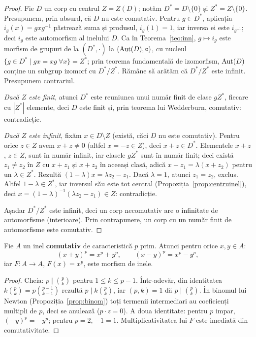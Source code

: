 \begin{proof}
Fie $D$ un corp cu centrul $Z=Z(D)$; notăm $D^*=D\setminus\{0\}$ și $Z^*=Z\setminus\{0\}$. Presupunem, prin absurd, că $D$ nu este comutativ. Pentru $g\in D^*$, aplicația $i_g(x)=gxg^{-1}$ păstrează suma și produsul, $i_g(1)=1$, iar inversa ei este $i_{g^{-1}}$; deci $i_g$ este automorfism al inelului $D$. Ca în Teorema~\ref{teo:inn}, $g\mapsto i_g$ este morfism de grupuri de la $(D^*,\cdot)$ la $(\operatorname{Aut}(D),\circ)$, cu nucleul $\{g\in D^*\mid gx=xg\ \forall x\}=Z^*$; prin teorema fundamentală de izomorfism, $\operatorname{Aut}(D)$ conține un subgrup izomorf cu $D^*/Z^*$. Rămâne să arătăm că $D^*/Z^*$ este infinit. Presupunem contrariul.

\emph{Dacă $Z$ este finit}, atunci $D^*$ este reuniunea unui număr finit de clase $gZ^*$, fiecare cu $|Z^*|$ elemente, deci $D$ este finit și, prin teorema lui Wedderburn, comutativ: contradicție.

\emph{Dacă $Z$ este infinit}, fixăm $x\in D\setminus Z$ (există, căci $D$ nu este comutativ). Pentru orice $z\in Z$ avem $x+z\neq0$ (altfel $x=-z\in Z$), deci $x+z\in D^*$. Elementele $x+z$, $z\in Z$, sunt în număr infinit, iar clasele $gZ^*$ sunt în număr finit; deci există $z_1\neq z_2$ în $Z$ cu $x+z_1$ și $x+z_2$ în aceeași clasă, adică $x+z_1=\lambda(x+z_2)$ pentru un $\lambda\in Z^*$. Rezultă $(1-\lambda)x=\lambda z_2-z_1$. Dacă $\lambda=1$, atunci $z_1=z_2$, exclus. Altfel $1-\lambda\in Z^*$, iar inversul său este tot central (Propoziția~\ref{prop:centruinel}), deci $x=(1-\lambda)^{-1}(\lambda z_2-z_1)\in Z$: contradicție.

Așadar $D^*/Z^*$ este infinit, deci un corp necomutativ are o infinitate de automorfisme (interioare). Prin contrapunere, un corp cu un număr finit de automorfisme este comutativ.
\end{proof}

\begin{teorema}\label{teo:frobenius}
Fie $A$ un inel \textbf{comutativ} de caracteristică $p$ prim. Atunci pentru orice $x,y\in A$:
\[
(x+y)^p=x^p+y^p,\qquad (x-y)^p=x^p-y^p,
\]
iar $F:A\to A$, $F(x)=x^p$, este morfism de inele.
\end{teorema}

\begin{proof}
Cheia: $p\mid\binom pk$ pentru $1\le k\le p-1$. Într-adevăr, din identitatea $k\binom pk=p\binom{p-1}{k-1}$ rezultă $p\mid k\binom pk$, iar $(p,k)=1$ dă $p\mid\binom pk$. În binomul lui Newton (Propoziția~\ref{prop:binom}) toți termenii intermediari au coeficienți multipli de $p$, deci se anulează ($p\cdot z=0$). A doua identitate: pentru $p$ impar, $(-y)^p=-y^p$; pentru $p=2$, $-1=1$. Multiplicativitatea lui $F$ este imediată din comutativitate.
\end{proof}


